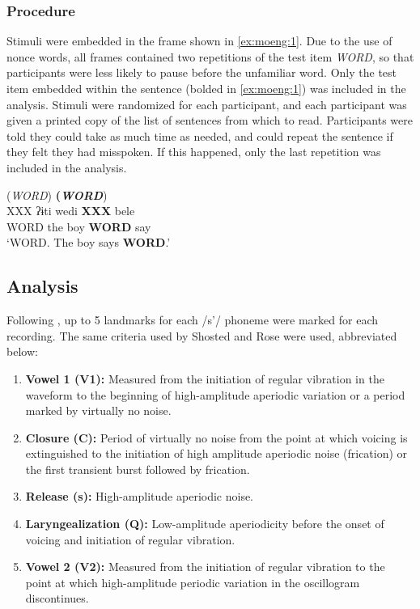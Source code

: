 \documentclass[output=paper,newtxmath,modfonts,nonflat,final]{langsci/langscibook}
\begin{document}
\subsubsection{Procedure}\label{sec:moeng:5.1.2}

Stimuli were embedded in the frame shown in \ref{ex:moeng:1}. Due to the use of nonce words, all frames contained two repetitions of the test item \textit{WORD}, so that participants were less likely to pause before the unfamiliar word. Only the test item embedded within the sentence (bolded in \ref{ex:moeng:1}) was included in the analysis. Stimuli were randomized for each participant, and each participant was given a printed copy of the list of sentences from which to read. Participants were told they could take as much time as needed, and could repeat the sentence if they felt they had misspoken. If this happened, only the last repetition was included in the analysis.

\ea\label{ex:moeng:1}
\glll (\textit{WORD})           \textbf{(\textit{WORD}})   \\
XXX    ʔɨti  wedi    \textbf{XXX}    bele\\
WORD  the  boy    \textbf{WORD}  say\\
\glt ‘WORD. The boy says \textbf{WORD}.’
\z

\subsection{Analysis}\label{sec:moeng:5.2}

Following \citet{shosted2011affricating}, up to 5 landmarks for each /s’/ phoneme were marked for each recording. The same criteria used by Shosted and Rose were used, abbreviated below:

\begin{enumerate}
	\item {\textbf{Vowel 1 (V1):} Measured from the initiation of regular vibration in the waveform to the beginning of high-amplitude aperiodic variation or a period marked by virtually no noise.}
\item {\textbf{Closure (C):} Period of virtually no noise from the point at which voicing is extinguished to the initiation of high amplitude aperiodic noise (frication) or the first transient burst followed by frication.}
\item {\textbf{Release (s):} High-amplitude aperiodic noise.}
\item {\textbf{Laryngealization (Q):} Low-amplitude aperiodicity before the onset of voicing and initiation of regular vibration.}
\item {\textbf{Vowel 2 (V2):} Measured from the initiation of regular vibration to the point at which high-amplitude periodic variation in the oscillogram discontinues.}
\end{enumerate}
\end{document}

